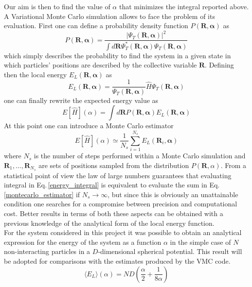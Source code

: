 Our aim is then to find the value of $\alpha$ that minimizes the integral reported above. A Variational Monte Carlo simulation allows to face the problem of its evaluation. First one can define a probability density function $P(\bm{R}, \bm{\alpha})$ as
\begin{equation*}
    P(\bm{R}, \bm{\alpha}) = \frac{\vert \Psi_T (\bm{R}, \bm{\alpha}) \vert^2}{\int d\bm{R} \Psi_T^*(\bm{R}, \bm{\alpha}) \Psi_T(\bm{R}, \bm{\alpha}) }
\end{equation*}
which simply describes the probability to find the system in a given state in which particles' positions are described by the collective variable $\bm{R}$. Defining then the local energy $E_L (\bm{R}, \bm{\alpha})$ as 
\begin{equation}
    E_L(\bm{R}, \bm{\alpha}) = \frac{1}{\Psi_T(\bm{R}, \bm{\alpha})} \hat{H} \Psi_T(\bm{R}, \bm{\alpha})
    \label{local_energy}
\end{equation}
one can finally rewrite the expected energy value as
\begin{equation}
    E[\hat{H}](\alpha) = \int d\bm{R} P(\bm{R}, \bm{\alpha}) E_L(\bm{R}, \bm{\alpha})
    \label{energy_integral}
\end{equation}
At this point one can introduce a Monte Carlo estimator
\begin{equation}
    E[\hat{H}](\alpha) \simeq \frac{1}{N_s} \sum_{i=1}^{N_s} E_L(\bm{R}_i, \bm{\alpha})
    \label{montecarlo_estimator}
\end{equation}
where $N_s$ is the number of steps performed within a Monte Carlo simulation and $\bm{R}_1, \dots, \bm{R}_{N_s}$ are sets of positions sampled from the distribution $P(\bm{R}, \alpha)$. From a statistical point of view the law of large numbers guarantees that evaluating integral in Eq.\,\ref{energy_integral} is equivalent to evaluate the sum in Eq.\,\ref{montecarlo_estimator} if $N_s \to \infty$, but since this is obviously an unattainable condition one searches for a compromise between precision and computational cost. Better results in terms of both these aspects can be obtained with a previous knowledge of the analytical form of the local energy function. \\
For the system considered in this project it was possible to obtain an analytical expression for the energy of the system as a function $\alpha$ in the simple case of $N$ non-interacting particles in a $D$-dimensional spherical potential. This result will be adopted for comparisons with the estimates produced by the VMC code.
\begin{equation}
    \langle E_L \rangle (\alpha) = ND \left(\frac{\alpha}{2} + \frac{1}{8\alpha} \right)
    \label{energy_analitical}
\end{equation}



